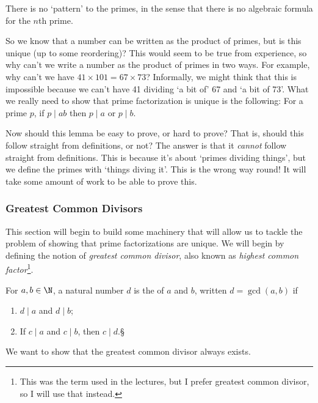 \documentclass[a4paper]{scrartcl}
\begin{document}
\begin{remark}
	There is no `pattern' to the primes, in the sense that there is no algebraic formula for the $n$th prime. 
\end{remark}

So we know that a number can be written as the product of primes, but is this unique (up to some reordering)? This would seem to be true from experience, so why can't we write a number as the product of primes in two ways. For example, why can't we have $41 \times 101 = 67 \times 73$? Informally, we might think that this is impossible because we can't have 41 dividing `a bit of' 67 and `a bit of 73'. What we really need to show that prime factorization is unique is the following: For a prime $p$, if $p \mid ab$ then $p \mid a$ or $p \mid b$.

Now should this lemma be easy to prove, or hard to prove? That is, should this follow straight from definitions, or not? The answer is that it \emph{cannot} follow straight from definitions. This is because it's about `primes dividing things', but we define the primes with `things diving it'. This is the wrong way round! It will take some amount of work to be able to prove this.

\subsubsection{Greatest Common Divisors}

This section will begin to build some machinery that will allow us to tackle the problem of showing that prime factorizations are unique. We will begin by defining the notion of \emph{greatest common divisor}, also known as \emph{highest common factor}\footnote{This was the term used in the lectures, but I prefer greatest common divisor, so I will use that instead.}.

\begin{definition}
	For $a, b \in \N$, a natural number $d$ is the  of $a$ and $b$, written $d = \gcd(a, b)$ if
	\begin{enumerate}[label=(\roman*)]
		\item $d \mid a$ and $d \mid b$;
		\item If $c \mid a$ and $c \mid b$, then $c \mid d$.§
	\end{enumerate}
\end{definition}

We want to show that the greatest common divisor always exists.
\end{document}
